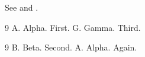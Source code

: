 \documentclass{article}
\begin{document}
See \citep{x,y} and \citet{x}.

\begin{thebibliography}{9}
A. Alpha. First.
G. Gamma. Third.
\end{thebibliography}

\begin{thebibliography}{9}
B. Beta. Second.
A. Alpha. Again.
\end{thebibliography}
\end{document}
